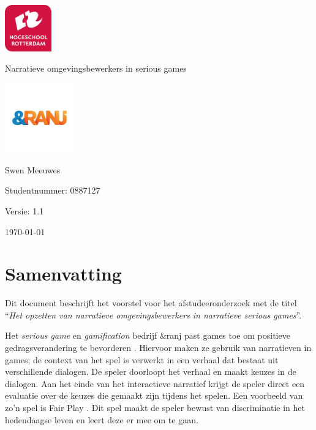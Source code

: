 \documentclass{report}
\newcommand{\versionnumber}{1.1}
\newcommand{\name}{Swen Meeuwes}
\newcommand{\studentnumber}{0887127}
\newcommand{\organisation}{\&ranj}
\renewcommand{\title}{Narratieve omgevingsbewerkers in serious games}
\newcommand{\subtitle}{}
\begin{document}
\begin{titlepage}
        \centering
        \includegraphics[width=2cm]{Images/University}\par
        \vspace{4\baselineskip}
        {\Huge\title\par}
        {\Large\subtitle\par}
        \par
        \includegraphics[width=3cm]{Images/Organisation}
        \vspace{4\baselineskip}
        \par
        {\Large\name\par}
        {Studentnummer: \studentnumber\par}
        \vfill
        {\hfill Versie: \versionnumber\par}
        {\hfill \today}
\end{titlepage}

\chapter*{Samenvatting}
Dit document beschrijft het voorstel voor het afstudeeronderzoek met de titel ``\emph{Het opzetten van narratieve omgevingsbewerkers in narratieve serious games}''.

Het \emph{serious game} en \emph{gamification} bedrijf \organisation{} past games toe om positieve gedragsverandering te bevorderen \cite{websiteranj}. Hiervoor maken ze gebruik van narratieven in games; de context van het spel is verwerkt in een verhaal dat bestaat uit verschillende dialogen. De speler doorloopt het verhaal en maakt keuzes in de dialogen. Aan het einde van het interactieve narratief krijgt de speler direct een evaluatie over de keuzes die gemaakt zijn tijdens het spelen. Een voorbeeld van zo'n spel is Fair Play \cite{fairplay}. Dit spel maakt de speler bewust van discriminatie in het hedendaagse leven en leert deze er mee om te gaan.
\end{document}
